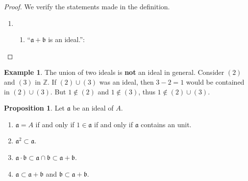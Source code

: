 \documentclass[a4paper]{book}
\theoremstyle{definition}
\newtheorem{example}{Example}[definition]
\newtheorem{proposition}[definition]{Proposition}
\begin{document}
\begin{proof}
    We verify the statements made in the definition.
    \begin{enumerate}
        \item \begin{enumerate}
            \item ``\(\mathfrak{a} + \mathfrak{b}\) is an ideal.'':
        \end{enumerate}
    \end{enumerate}
\end{proof}

\begin{exmbox}
    \begin{example}
        The union of two ideals is \textbf{not} an ideal in general. Consider \((2)\) and \((3)\) in \(\mathbb{Z}\). If \((2) \cup (3)\) was an ideal, then \(3 - 2 = 1\) would be contained in \((2) \cup (3)\). But \(1 \not\in (2)\) and \(1 \not\in (3)\), thus \(1 \not\in (2) \cup (3)\).
    \end{example}
\end{exmbox}

\begin{thmbox}
    \begin{proposition}
        Let \(\mathfrak{a}\) be an ideal of \(A\).
        \begin{enumerate}
            \item \(\mathfrak{a} = A\) if and only if \(1 \in \mathfrak{a}\) if and only if \(\mathfrak{a}\) contains an unit.
            \item \(\mathfrak{a}^2 \subset \mathfrak{a}\).
            \item \(\mathfrak{a} \cdot \mathfrak{b} \subset \mathfrak{a} \cap \mathfrak{b} \subset \mathfrak{a} + \mathfrak{b}\).
            \item \(\mathfrak{a} \subset \mathfrak{a} + \mathfrak{b}\) and \(\mathfrak{b} \subset \mathfrak{a} + \mathfrak{b}\).
        \end{enumerate}
    \end{proposition}
\end{thmbox}
\end{document}
